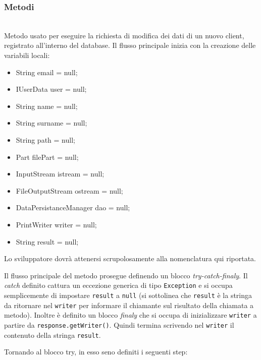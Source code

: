 \subsubsection*{Metodi}
\begin{description}
	\item{}\\	
	Metodo usato per eseguire la richiesta di modifica dei dati di un nuovo client, registrato all'interno del database. Il flusso principale inizia con la creazione delle variabili locali:

\begin{itemize}
\item String email = null;
\item IUserData user = null;
\item String name = null;
\item String surname = null;
\item String path = null;
\item Part filePart = null;
\item InputStream istream = null;
\item FileOutputStream ostream = null;
\item DataPersistanceManager dao = null;
\item PrintWriter writer = null;
\item String result = null;
\end{itemize}	

Lo sviluppatore dovrà attenersi scrupolosamente alla nomenclatura qui riportata.

Il flusso principale del metodo prosegue definendo un blocco \textit{try-catch-finaly}. Il \textit{catch} definito cattura un eccezione generica di tipo \texttt{Exception} e si occupa semplicemente di impostare \texttt{result} a \texttt{null} (si sottolinea che \texttt{result} è la stringa da ritornare nel \texttt{writer} per informare il chiamante sul risultato della chiamata a metodo). Inoltre è definito un blocco \textit{finaly} che si occupa di inizializzare \texttt{writer} a partire da \texttt{response.getWriter()}. Quindi termina scrivendo nel \texttt{writer} il contenuto della stringa \texttt{result}.

Tornando al blocco try, in esso seno definiti i seguenti step:


\end{description}
